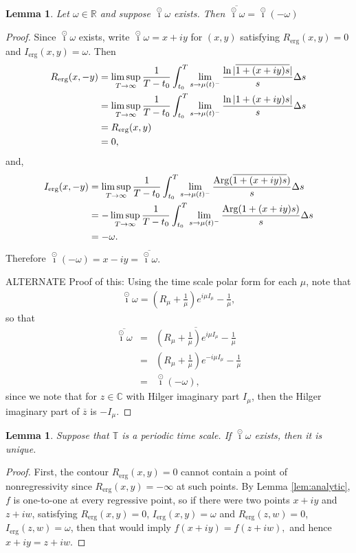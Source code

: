 \documentclass[reqno]{amsart}
\theoremstyle{plain}
\newtheorem{lemma}[theorem]{Lemma}
\theoremstyle{definition}
\numberwithin{theorem}{section}
\numberwithin{definition}{section}
\numberwithin{prop}{section}
\numberwithin{example}{section}
\newcommand{\C}{\ensuremath{\mathbb{C}}}
\newcommand{\Rerg}{\ensuremath{R_{\text{erg}}}}
\newcommand{\Ierg}{\ensuremath{I_{\text{erg}}}}
\def\icirc{\overset{\odot}{\imath}}
\begin{document}
\begin{lemma}
Let $\omega \in \mathbb{R}$ and suppose $\icirc \omega$ exists. Then $\overline{\icirc \omega} = \icirc (-\omega)$
\end{lemma}
\begin{proof}
Since $\icirc \omega$ exists, write $\icirc \omega = x+iy$ for $(x,y)$ satisfying
$\Rerg(x,y)=0$ and $\Ierg(x,y)=\omega.$ Then 
\begin{align*}
    \Rerg(x,-y)& =\limsup_{T \rightarrow \infty} {1\over T-t_0}\int_{t_0}^{T} \lim_{s \rightarrow \mu(t)^{-}}\frac{\ln |\overline{1+(x+iy)s}|}{s} \Delta s \\
    & = \limsup_{T \rightarrow \infty} {1\over T-t_0}\int_{t_0}^{T} \lim_{s \rightarrow \mu(t)^{-}} \frac{\ln |1+(x+iy)s|}{s} \Delta s\\
    & = \Rerg(x,y) \\
    & = 0,
\end{align*}
and,
\begin{align*}
    \Ierg(x,-y) & = \limsup_{T \rightarrow \infty} {1\over T-t_0}\int_{t_0}^{T} \lim_{s \rightarrow \mu(t)^{-}} \frac{\text{Arg}(\overline{1+(x+iy)s})}{s} \Delta s \\
    & = -\limsup_{T \rightarrow \infty} {1\over T-t_0}\int_{t_0}^{T} \lim_{s \rightarrow \mu(t)^{-}} \frac{\text{Arg}(1+(x+iy)s)}{s} \Delta s \\
    & = - \omega.
\end{align*}
Therefore $\icirc (-\omega) = x-iy = \overline{\icirc \omega}.$

ALTERNATE Proof of this:  Using the time scale polar form for each $\mu$, note that 
\begin{eqnarray*}
    \icirc \omega = \left(R_\mu+\frac{1}{\mu}\right)e^{i \mu I_\mu}-\frac{1}{\mu}, 
\end{eqnarray*}
so that
\begin{eqnarray*}
\overline{\icirc \omega} &= & \overline{ \left(R_\mu+\frac{1}{\mu}\right)e^{i \mu I_\mu}-\frac{1}{\mu}} \\
& = & \left(R_\mu+\frac{1}{\mu}\right)e^{-i \mu I_\mu}-\frac{1}{\mu} \\
& = & \icirc (-\omega),
\end{eqnarray*}
since we note that for $z \in \C$ with Hilger imaginary part $I_\mu$, then the Hilger imaginary part of $\overline{z}$ is $-I_\mu$.
\end{proof}

\begin{lemma}
Suppose that $\mathbb{T}$ is a periodic time scale. If $\icirc \omega$ exists, then it is unique.
\end{lemma}
\begin{proof}
First, the contour $\Rerg(x,y)=0$ cannot contain a point of nonregressivity since $\Rerg(x,y)= -\infty$ at such points. By Lemma \ref{lem:analytic}, $f$ is one-to-one at every regressive point, so if there were two points $x+iy$ and $z+iw$, satisfying $\Rerg(x,y)=0$, $\Ierg(x,y)=\omega$ and $\Rerg(z,w)=0$, $\Ierg(z,w)=\omega$, then that would imply $f(x+iy)=f(z+iw),$ and hence $x+iy=z+iw$.
\end{proof}
\end{document}
